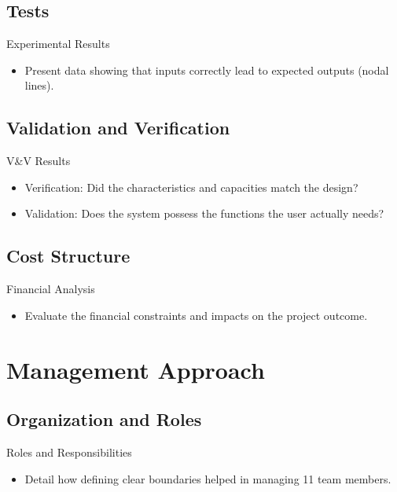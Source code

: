 \documentclass[aspectratio=169, 10pt, shadow]{beamer}
\begin{document}
\subsection{Tests}
\begin{frame}{Experimental Results}
  \begin{itemize}
      \item Present data showing that inputs correctly lead to expected outputs (nodal lines).
  \end{itemize}
\end{frame}

\subsection{Validation and Verification}
\begin{frame}{V\&V Results}
  \begin{itemize}
      \item Verification: Did the characteristics and capacities match the design?
      \item Validation: Does the system possess the functions the user actually needs?
  \end{itemize}
\end{frame}

\subsection{Cost Structure}
\begin{frame}{Financial Analysis}
  \begin{itemize}
      \item Evaluate the financial constraints and impacts on the project outcome.
  \end{itemize}
\end{frame}

\section{Management Approach}
\subsection{Organization and Roles}
\begin{frame}{Roles and Responsibilities}
  \begin{itemize}
      \item Detail how defining clear boundaries helped in managing 11 team members.
  \end{itemize}
\end{frame}
\end{document}
